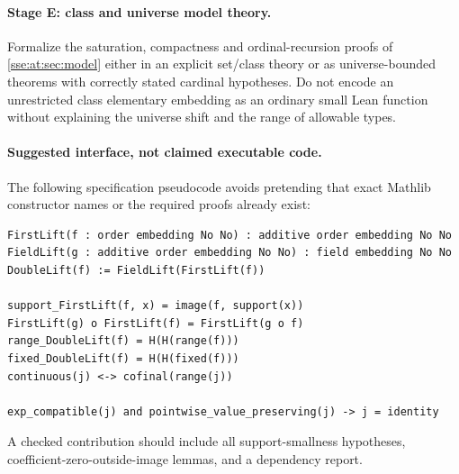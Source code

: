 \documentclass[11pt,a4paper]{article}
\numberwithin{equation}{section}
\theoremstyle{plain}
\theoremstyle{definition}
\theoremstyle{remark}
\begin{document}
\paragraph{Stage E: class and universe model theory.} Formalize the
saturation, compactness and ordinal-recursion proofs of
\cref{sse:at:sec:model} either in an explicit set/class theory or as
universe-bounded theorems with correctly stated cardinal hypotheses. Do not
encode an unrestricted class elementary embedding as an ordinary small Lean
function without explaining the universe shift and the range of allowable
types.

\paragraph{Suggested interface, not claimed executable code.} The following
specification pseudocode avoids pretending that exact Mathlib constructor
names or the required proofs already exist:
\begin{verbatim}
FirstLift(f : order embedding No No) : additive order embedding No No
FieldLift(g : additive order embedding No No) : field embedding No No
DoubleLift(f) := FieldLift(FirstLift(f))

support_FirstLift(f, x) = image(f, support(x))
FirstLift(g) o FirstLift(f) = FirstLift(g o f)
range_DoubleLift(f) = H(H(range(f)))
fixed_DoubleLift(f) = H(H(fixed(f)))
continuous(j) <-> cofinal(range(j))

exp_compatible(j) and pointwise_value_preserving(j) -> j = identity
\end{verbatim}
A checked contribution should include all support-smallness hypotheses,
coefficient-zero-outside-image lemmas, and a dependency report.
\end{document}
